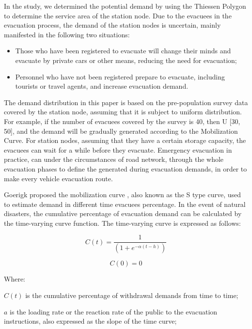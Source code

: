 \documentclass{mcmthesis}
\begin{document}
In the study, we determined the potential demand by using the Thiessen Polygon to determine the service area of the station node. Due to the evacuees in the evacuation process, the demand of the station nodes is uncertain, mainly manifested in the following two situations:

\begin{itemize}

  \item Those who have been registered to evacuate will change their minds and evacuate by private cars or other means, reducing the need for evacuation;
  \item Personnel who have not been registered prepare to evacuate, including tourists or travel agents, and increase evacuation demand.

\end{itemize}

The demand distribution in this paper is based on the pre-population survey data covered by the station node, assuming that it is subject to uniform distribution. For example, if the number of evacuees covered by the survey is 40, then U [30, 50], and the demand will be gradually generated according to the Mobilization Curve.
For station nodes, assuming that they have a certain storage capacity, the evacuees can wait for a while before they evacuate. Emergency evacuation in practice, can under the circumstances of road network, through the whole evacuation phases to define the generated during evacuation demands, in order to make every vehicle evacuation route.

Goerigk proposed the mobilization curve \cite{Goerigk2014A,Goerigk2013Branch}, also known as the S type curve, used to estimate demand in different time evacuees percentage. In the event of natural disasters, the cumulative percentage of evacuation demand can be calculated by the time-varying curve function. The time-varying curve is expressed as follows:


\begin{equation}\label{1}
  C(t) = \frac{1}{{(1 + {e^{ - \alpha (t - h)}})}}
\end{equation}

\begin{equation}\label{2}
  C(0) = 0
\end{equation}

Where:

$C(t)$ is the cumulative percentage of withdrawal demands from time to time;

$a$ is the loading rate or the reaction rate of the public to the evacuation instructions, also expressed as the slope of the time curve;
\end{document}
